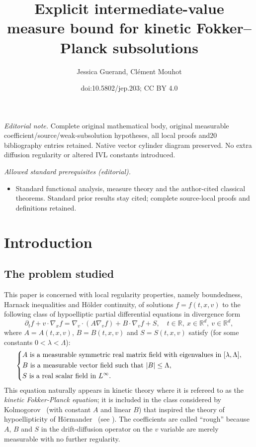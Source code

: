 \documentclass[10pt]{amsart}
\title{Explicit intermediate-value measure bound for kinetic Fokker–Planck subsolutions}
\author{Jessica Guerand, Clément Mouhot}
\date{doi:10.5802/jep.203; CC BY 4.0}
\theoremstyle{definition}
\theoremstyle{remark}
\newcommand\R{{\mathbb R}}
\begin{document}
\maketitle
\noindent\textit{Editorial note.} Complete original mathematical body, original measurable coefficient/source/weak-subsolution hypotheses, all local proofs and20 bibliography entries retained. Native vector cylinder diagram preserved. No extra diffusion regularity or altered IVL constants introduced.\par\medskip
\noindent\textit{Allowed standard prerequisites (editorial).}\begin{itemize}
\item Standard functional analysis, measure theory and the author-cited classical theorems. Standard prior results stay cited; complete source-local proofs and definitions retained.
\end{itemize}\medskip
\vspace*{-\baselineskip}
\tableofcontents


\section{Introduction}

\label{sec:intro}

\subsection{The problem studied}
\label{sec:theequation}

This paper is concerned with local regularity properties, namely
boundedness, Harnack inequalities and Hölder continuity, of
solutions $f=f(t,x,v)$ to the following class of hypoelliptic
partial differential equations in divergence form
\begin{equation}
\label{e:main}
\partial_t f + v \cdot \nabla_x f = \nabla_v \cdot (
A \nabla_v f) + B \cdot \nabla_v f + S,
\quad t \in \R, \ x \in \R^d, \ v \in \R^d,
\end{equation}
where $A=A(t,x,v)$, $B=B(t,x,v)$ and $S=S(t,x,v)$ satisfy (for some
constants $0 < \lambda < \Lambda$):
\begin{equation}
\label{e:hyp-coef}
\begin{dcases}
\text{$A$ is a measurable symmetric real matrix field with
eigenvalues in } [\lambda,\Lambda],\\
\text{$B$ is a measurable vector field such that }
|B| \le \Lambda,\\
\text{$S$ is a real scalar field in $L^\infty$.}
\end{dcases}
\end{equation}
This equation naturally appears in kinetic theory where it is
refereed to as the \emph{kinetic Fokker-Planck equation}; it is
included in the class considered by Kolmogorov~\cite{kolmogorov}
(with constant $A$ and linear $B$) that inspired the theory of
hypoellipticity of Hörmander~\cite{MR0222474} (see
\cite{AP20}). The coefficients are called ``rough'' because $A$,
$B$ and $S$ in the drift-diffusion operator on the $v$ variable
are merely measurable with no further regularity.
\end{document}
